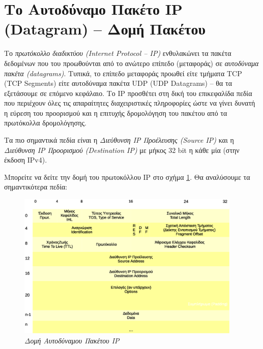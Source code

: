 %
%
\section{Το Αυτοδύναμο Πακέτο IP (Datagram) -- Δομή Πακέτου}

Το \emph{πρωτόκολλο διαδικτύου (Internet Protocol -- IP)} ενθυλακώνει τα πακέτα δεδομένων που του προωθούνται από το ανώτερο επίπεδο (μεταφοράς) σε \emph{αυτοδύναμα πακέτα (datagrams)}. Τυπικά, το επίπεδο μεταφοράς προωθεί είτε τμήματα TCP (TCP Segments) είτε αυτοδύναμα πακέτα UDP (UDP Datagrams) -- θα τα εξετάσουμε σε επόμενο κεφάλαιο. Το IP προσθέτει στη δική του επικεφαλίδα πεδία που περιέχουν όλες τις απαραίτητες διαχειριστικές πληροφορίες ώστε να γίνει δυνατή η εύρεση του προορισμού και η επιτυχής δρομολόγηση του πακέτου από τα πρωτόκολλα δρομολόγησης.

Τα πιο σημαντικά πεδία είναι η \emph{Διεύθυνση IP Προέλευσης (Source IP)} και η \emph{Διεύθυνση IP Προορισμού (Destination IP)} με μήκος 32 bit η κάθε μία (στην έκδοση IPv4).

Μπορείτε να δείτε την δομή του πρωτοκόλλου IP στο σχήμα \ref{3-5}. Θα αναλύσουμε τα σημαντικότερα πεδία:

\begin{figure}[!ht]
  \centering
  \includegraphics[width=0.95\textwidth]{images/chapter3/3-5}
  \caption {\textsl{Δομή Αυτοδύναμου Πακέτου IP}}
  \label{3-5}
\end{figure}

